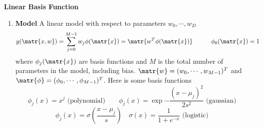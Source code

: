 \documentclass[11pt]{article}
\begin{document}
\begin{defn*}
    \textbf{Linear Basis Function}
    \begin{enumerate}
        \item \textbf{Model} A linear model with respect to parameters $w_0, \cdots, w_D$ 
        \[
            y(\matr{x,w}) = \sum_{j=0}^{M-1} w_j \phi(\matr{x}) = \matr{w^T \phi(\matr{x})}
            \quad \quad \quad 
            \phi_0(\matr{x}) = 1
        \]
        where $\phi_j(\matr{x})$ are basis functions and $M$ is the total number of parameters in the model, including bias. $\matr{w} = (w_0,\cdots,w_{M-1})^T$ and $\matr{\phi} = (\phi_0,\cdots,\phi_{M-1})^T$. Here is some basis functions 
        \[
            \phi_j(x) = x^j \text{ (polynomial)}
            \quad \quad 
            \phi_j(x) = \exp{-\frac{(x-\mu_j)^2}{2s^2}}  \text{ (gaussian)}
        \]
        \[
            \phi_j(x) = \sigma(\frac{x-\mu_j}{s}) 
            \quad 
            \sigma(x) = \frac{1}{1+e^{-x}} \text{ (logistic)}   
        \]
    \end{enumerate}
\end{defn*}
\end{document}
